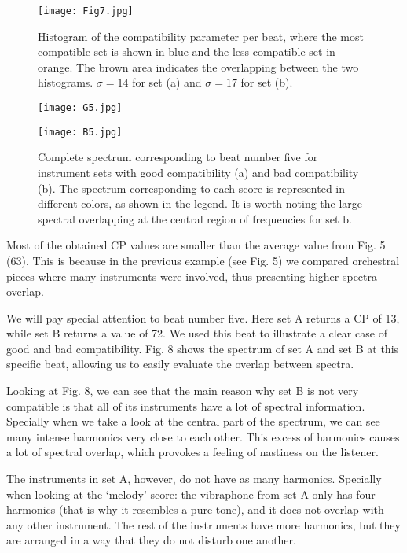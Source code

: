 \documentclass[twocolumn]{revtex4}
\begin{document}
\begin{figure}[h!]
\centering
\texttt{[image: Fig7.jpg]}
\caption{Histogram of the compatibility parameter per beat, where the most compatible set is shown in blue and the less compatible set in orange. The brown area indicates the overlapping between the two histograms. $\sigma = 14$ for set (a) and $\sigma = 17$ for set (b).}
\end{figure}

\begin{figure}[]
\centering
\texttt{[image: G5.jpg]}
\end{figure}

\begin{figure}[]
\centering
\texttt{[image: B5.jpg]}
\caption{Complete spectrum corresponding to beat number five for instrument sets with good compatibility (a) and bad compatibility (b). The spectrum corresponding to each score is represented in different colors, as shown in the legend. It is worth noting the large spectral overlapping at the central region of frequencies for set b.}
\end{figure}

Most of the obtained CP values are smaller than the average value from Fig. 5 (63). This is because in the previous example (see Fig. 5) we compared orchestral pieces where many instruments were involved, thus presenting higher spectra overlap. 

We will pay special attention to beat number five. Here set A returns a CP of 13, while set B returns a value of 72. We used this beat to illustrate a clear case of good and bad compatibility. Fig. 8 shows the spectrum of set A and set B at this specific beat, allowing us to easily evaluate the overlap between spectra. 

Looking at Fig. 8, we can see that the main reason why set B is not very compatible is that all of its instruments have a lot of spectral information. Specially when we take a look at the central part of the spectrum, we can see many intense harmonics very close to each other. This excess of harmonics causes a lot of spectral overlap, which provokes a feeling of nastiness on the listener.

The instruments in set A, however, do not have as many harmonics. Specially when looking at the `melody' score: the vibraphone from set A only has four harmonics (that is why it resembles a pure tone), and it does not overlap with any other instrument. The rest of the instruments have more harmonics, but they are arranged in a way that they do not disturb one another.
\end{document}
